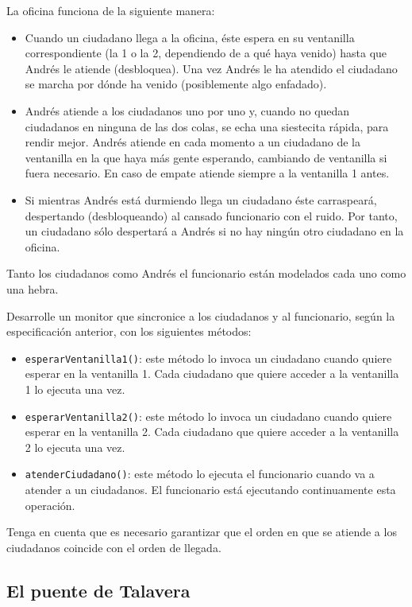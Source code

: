 \documentclass[a4paper]{article}
\newcommand{\code}[1]{\texttt{#1}}
\begin{document}
La oficina funciona de la siguiente manera:

\begin{itemize}
    \item Cuando un ciudadano llega a la oficina, éste espera en su ventanilla correspondiente (la 1 o la 2, dependiendo de a qué haya venido) hasta que Andrés le atiende (desbloquea). Una vez Andrés le ha atendido el ciudadano se marcha por dónde ha venido (posiblemente algo enfadado).
    \item Andrés atiende a los ciudadanos uno por uno y, cuando no quedan ciudadanos en ninguna de las dos colas, se echa una siestecita rápida, para rendir mejor. Andrés atiende en cada momento a un ciudadano de la ventanilla en la que haya más gente esperando, cambiando de ventanilla si fuera necesario. En caso de empate atiende siempre a la ventanilla 1 antes.
    \item Si mientras Andrés está durmiendo llega un ciudadano éste carraspeará, despertando (desbloqueando) al cansado funcionario con el ruido. Por tanto, un ciudadano sólo despertará a Andrés si no hay ningún otro ciudadano en la oficina.
\end{itemize}

Tanto los ciudadanos como Andrés el funcionario están modelados cada uno como una hebra.

Desarrolle un monitor que sincronice a los ciudadanos y al funcionario, según la especificación anterior, con los siguientes métodos:

\begin{itemize}
    \item \code{esperarVentanilla1()}: este método lo invoca un ciudadano cuando quiere esperar en la ventanilla 1. Cada ciudadano que quiere acceder a la ventanilla 1 lo ejecuta una vez.
    \item \code{esperarVentanilla2()}: este método lo invoca un ciudadano cuando quiere esperar en la ventanilla 2. Cada ciudadano que quiere acceder a la ventanilla 2 lo ejecuta una vez.
    \item \code{atenderCiudadano()}: este método lo ejecuta el funcionario cuando va a atender a un ciudadanos. El funcionario está ejecutando continuamente esta operación.
\end{itemize}

Tenga en cuenta que es necesario garantizar que el orden en que se atiende a los ciudadanos coincide con el orden de llegada.

\subsection{El puente de Talavera}
\end{document}
